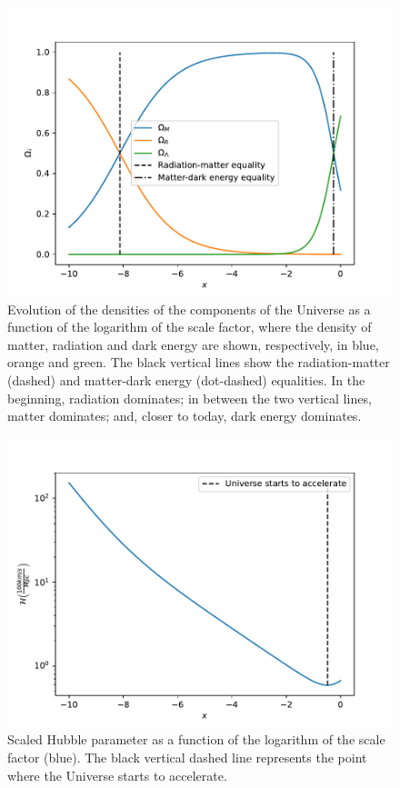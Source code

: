 \documentclass{aa}
\begin{document}
\begin{figure}[ht]
\centering
\includegraphics[width=\hsize]{figures/Omegas.pdf}
  \caption{Evolution of the densities of the components of the Universe as a function of the logarithm of the scale factor, where the density of matter, radiation and dark energy are shown, respectively, in blue, orange and green. The black vertical lines show the radiation-matter (dashed) and matter-dark energy (dot-dashed) equalities. In the beginning, radiation dominates; in between the two vertical lines, matter dominates; and, closer to today, dark energy dominates.}
     \label{fig:Omegas}
\end{figure}

\begin{figure}[ht]
\centering
\includegraphics[width=\hsize]{figures/Hp.pdf}
  \caption{Scaled Hubble parameter as a function of the logarithm of the scale factor (blue). The black vertical dashed line represents the point where the Universe starts to accelerate.}
     \label{fig:Hp}
\end{figure}
\end{document}
